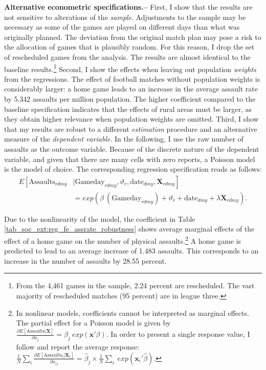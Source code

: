 \textbf{Alternative econometric specifications.--} First, I show that the results are not sensitive to alterations of the \textit{sample}. Adjustments to the sample may be necessary as some of the games are played on different days than what was originally planned. The deviation from the original match plan may pose a risk to the allocation of games that is plausibly random. For this reason, I drop the set of rescheduled games from the analysis. The results are almost identical to the baseline results.\footnote{From the 4,461 games in the sample, 2.24 percent are rescheduled. The vast majority of rescheduled matches (95 percent) are in league three.} Second, I show the effects when leaving out population \textit{weights} from the regressions. The effect of football matches without population weights is considerably larger: a home game leads to an increase in the average assault rate by 5.342 assaults per million population. The higher coefficient compared to the baseline specification indicates that the effects of rural areas must be larger, as they obtain higher relevance when population weights are omitted. Third, I show that my results are robust to a different \textit{estimation} procedure and an alternative measure of the \textit{dependent variable}. In the following, I use the raw number of assaults as the outcome variable. Because of the discrete nature of the dependent variable, and given that there are many cells with zero reports, a Poisson model is the model of choice. The corresponding regression specification reads as follows:
\begin{align}
E\left[ \text{Assaults}_{rdmy}\right.&|\left.\text{Gameday}_{rdmy},\vartheta_r,\text{date}_{dmy}, \mathbf{X}_{rdmy} \right] \nonumber \\ &= exp\left( \beta\ (\text{Gameday}_{rdmy}) + \vartheta_r + \text{date}_{dmy} + \lambda\mathbf{X}_{rdmy} \right). 
\label{eq_soc_ext:poisson_model}
\end{align}

Due to the nonlinearity of the model, the coefficient in Table \ref{tab_soc_ext:reg_fe_assrate_robustness} shows average marginal effects of the effect of a home game on the number of physical assaults.\footnote{In nonlinear models, coefficients cannot be interpreted as marginal effects. The partial effect for a Poisson model is given by $\frac{\partial E\left[ \text{Assaults}| \mathbf{X}\right]}{\partial x_j} = \beta_j\ exp(\mathbf{x'}\beta)$. In order to present a single response value, I follow \cite{cameron2005microeconometrics} and report the average response: $\frac{1}{N}\sum_i \frac{\partial E\left[ \text{Assaults}_i| \mathbf{X}_i\right]}{\partial x_{ij}} = \hat\beta_j \times \frac{1}{N} \sum_i\ exp(\mathbf{x}_i'\hat\beta)$.} A home game is predicted to lead to an average increase of 1.483 assaults. This corresponds to an increase in the number of assaults by 28.55 percent. \newline


